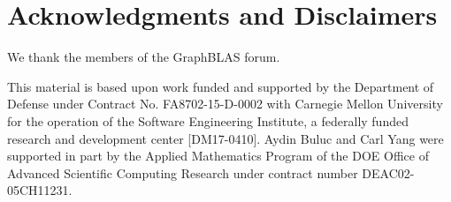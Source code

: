 %
%

\section*{Acknowledgments and Disclaimers}

We thank the members of the GraphBLAS forum.

This material is based upon work funded and supported by the Department of 
Defense under Contract No. FA8702-15-D-0002 with Carnegie Mellon University for 
the operation of the Software Engineering Institute, a federally funded research 
and development center [DM17-0410]. Aydin Buluc and Carl Yang were supported in part by the
Applied Mathematics Program of the DOE Office of Advanced
Scientific Computing Research under contract number DEAC02-05CH11231.


